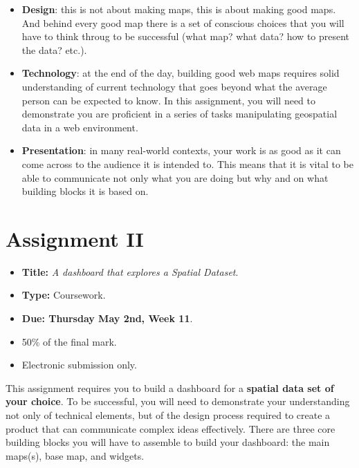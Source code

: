 \documentclass[
  letterpaper,
  DIV=11,
  numbers=noendperiod]{scrreprt}
\providecommand{\tightlist}{%
  \setlength{\itemsep}{0pt}\setlength{\parskip}{0pt}}\usepackage{longtable,booktabs,array}
\begin{document}
\begin{itemize}
\tightlist
\item
  \textbf{Design}: this is not about making maps, this is about making
  good maps. And behind every good map there is a set of conscious
  choices that you will have to think throug to be successful (what map?
  what data? how to present the data? etc.).
\item
  \textbf{Technology}: at the end of the day, building good web maps
  requires solid understanding of current technology that goes beyond
  what the average person can be expected to know. In this assignment,
  you will need to demonstrate you are proficient in a series of tasks
  manipulating geospatial data in a web environment.
\item
  \textbf{Presentation}: in many real-world contexts, your work is as
  good as it can come across to the audience it is intended to. This
  means that it is vital to be able to communicate not only what you are
  doing but why and on what building blocks it is based on.
\end{itemize}

\hypertarget{assignment-ii}{%
\section*{Assignment II}\label{assignment-ii}}


\begin{itemize}
\tightlist
\item
  \textbf{Title:} \emph{A dashboard that explores a Spatial Dataset}.
\item
  \textbf{Type:} Coursework.
\item
  \textbf{Due: Thursday May 2nd, Week 11}.
\item
  50\% of the final mark.
\item
  Electronic submission only.
\end{itemize}

This assignment requires you to build a dashboard for a \textbf{spatial
data set of your choice}. To be successful, you will need to demonstrate
your understanding not only of technical elements, but of the design
process required to create a product that can communicate complex ideas
effectively. There are three core building blocks you will have to
assemble to build your dashboard: the main maps(s), base map, and
widgets.
\end{document}
